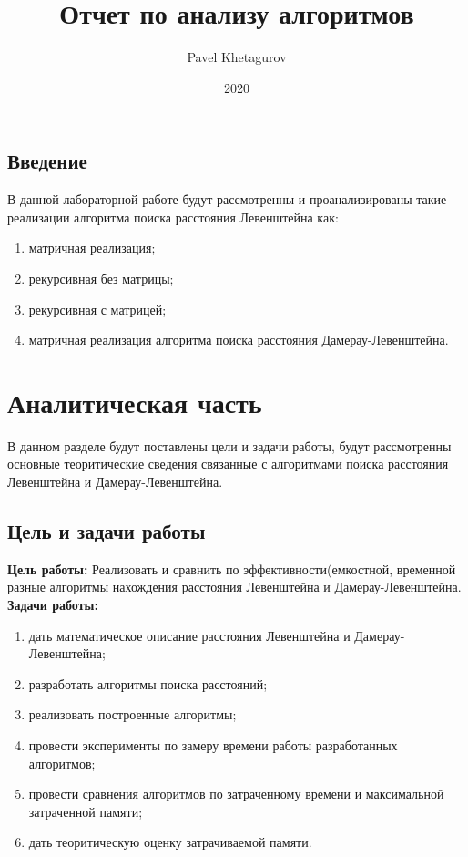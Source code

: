 \documentclass{article}
\title{Отчет по анализу алгоритмов}
\date{2020}
\author{Pavel Khetagurov}
\begin{document}
	
	\newpage
	\tableofcontents
	\newpage
	\begin{center}
	    \section*{Введение}
	\end{center}
		\indent \indent В данной лабораторной работе будут рассмотренны и проанализированы такие реализации алгоритма поиска расстояния Левенштейна как:
		\begin{enumerate}
		\item матричная реализация;
		\item рекурсивная без матрицы;
		\item рекурсивная с матрицей;
		\item матричная реализация алгоритма поиска расстояния Дамерау-Левенштейна.
		\end{enumerate}
	\newpage
	\section{Аналитическая часть}
	В данном разделе будут поставлены цели и задачи работы, будут рассмотренны основные теоритические сведения связанные с алгоритмами поиска расстояния Левенштейна и Дамерау-Левенштейна.
		\subsection{Цель и задачи работы}
			\textbf{Цель работы:}
			\newline
			\indent Реализовать и сравнить по эффективности(емкостной, временной разные алгоритмы нахождения расстояния Левенштейна и Дамерау-Левенштейна.
			\newline \indent
			\textbf{Задачи работы:}
			\indent \begin{enumerate}[1)]
				\item дать математическое описание расстояния Левенштейна и Дамерау-Левенштейна;
				\item разработать алгоритмы поиска расстояний;
				\item реализовать построенные алгоритмы;
				\item провести эксперименты по замеру времени работы разработанных алгоритмов;
				\item провести сравнения алгоритмов по затраченному времени и максимальной затраченной памяти;
				\item дать теоритическую оценку затрачиваемой памяти.
			\end{enumerate}
\end{document}
